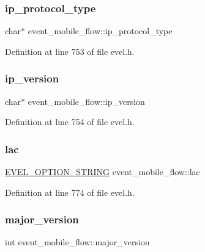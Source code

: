 \subsubsection{\texorpdfstring{ip\+\_\+protocol\+\_\+type}{ip\_protocol\_type}}
{\footnotesize\ttfamily char$\ast$ event\+\_\+mobile\+\_\+flow\+::ip\+\_\+protocol\+\_\+type}



Definition at line 753 of file evel.\+h.

\hypertarget{structevent__mobile__flow_a3e45a01a9a8a6bd039d767dd7c385229}{}\label{structevent__mobile__flow_a3e45a01a9a8a6bd039d767dd7c385229} 
\subsubsection{\texorpdfstring{ip\+\_\+version}{ip\_version}}
{\footnotesize\ttfamily char$\ast$ event\+\_\+mobile\+\_\+flow\+::ip\+\_\+version}



Definition at line 754 of file evel.\+h.

\hypertarget{structevent__mobile__flow_ada856682c9df790a67f690818e4823c1}{}\label{structevent__mobile__flow_ada856682c9df790a67f690818e4823c1} 
\subsubsection{\texorpdfstring{lac}{lac}}
{\footnotesize\ttfamily \hyperlink{evel_8h_a0de5113a7b72de93c0c7b644f7ea7ec3}{E\+V\+E\+L\+\_\+\+O\+P\+T\+I\+O\+N\+\_\+\+S\+T\+R\+I\+NG} event\+\_\+mobile\+\_\+flow\+::lac}



Definition at line 774 of file evel.\+h.

\hypertarget{structevent__mobile__flow_a1cc484e20bd04bd631663af83f32df23}{}\label{structevent__mobile__flow_a1cc484e20bd04bd631663af83f32df23} 
\subsubsection{\texorpdfstring{major\+\_\+version}{major\_version}}
{\footnotesize\ttfamily int event\+\_\+mobile\+\_\+flow\+::major\+\_\+version}



